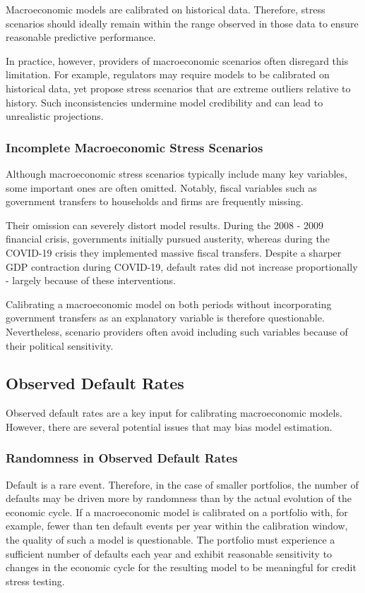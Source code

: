 \documentclass[11pt,a4paper]{article}
\begin{document}
Macroeconomic models are calibrated on historical data. Therefore, stress scenarios should ideally remain within the range observed in those data to ensure reasonable predictive performance.

In practice, however, providers of macroeconomic scenarios often disregard this limitation. For example, regulators may require models to be calibrated on historical data, yet propose stress scenarios that are extreme outliers relative to history. Such inconsistencies undermine model credibility and can lead to unrealistic projections.

\subsubsection{Incomplete Macroeconomic Stress Scenarios}

Although macroeconomic stress scenarios typically include many key variables, some important ones are often omitted. Notably, fiscal variables such as government transfers to households and firms are frequently missing.

Their omission can severely distort model results. During the 2008 - 2009 financial crisis, governments initially pursued austerity, whereas during the COVID-19 crisis they implemented massive fiscal transfers. Despite a sharper GDP contraction during COVID-19, default rates did not increase proportionally - largely because of these interventions.

Calibrating a macroeconomic model on both periods without incorporating government transfers as an explanatory variable is therefore questionable. Nevertheless, scenario providers often avoid including such variables because of their political sensitivity.

\subsection{Observed Default Rates}

Observed default rates are a key input for calibrating macroeconomic models. However, there are several potential issues that may bias model estimation.

\subsubsection{Randomness in Observed Default Rates}

Default is a rare event. Therefore, in the case of smaller portfolios, the number of defaults may be driven more by randomness than by the actual evolution of the economic cycle. If a macroeconomic model is calibrated on a portfolio with, for example, fewer than ten default events per year within the calibration window, the quality of such a model is questionable. The portfolio must experience a sufficient number of defaults each year and exhibit reasonable sensitivity to changes in the economic cycle for the resulting model to be meaningful for credit stress testing.
\end{document}
